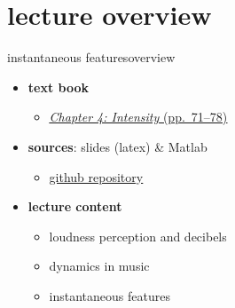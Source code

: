 

\subtitle{Part 5.1: Intensity}


	

    \section[overview]{lecture overview}
        \begin{frame}{instantaneous features}{overview}
            \begin{itemize}
                \item   \textbf{text book}  
                    \begin{itemize}
                        \item   \href{http://ieeexplore.ieee.org/xpl/articleDetails.jsp?tp=&arnumber=6331121&}{\underline{\textit{Chapter 4: Intensity} (pp.~71--78)}}
                    \end{itemize}
                \item   \textbf{sources}: slides (latex) \& Matlab  
                    \begin{itemize}
                        \item   \href{https://github.com/alexanderlerch/ACA-Slides}{\underline{github repository}}
                    \end{itemize}
                \bigskip
                \item<2->   \textbf{lecture content}
                    \begin{itemize}
                        \item<2->   loudness perception and decibels
                        \item<3->   dynamics in music
                        \item<4->   instantaneous features
                    \end{itemize}
            \end{itemize}
        \end{frame}

